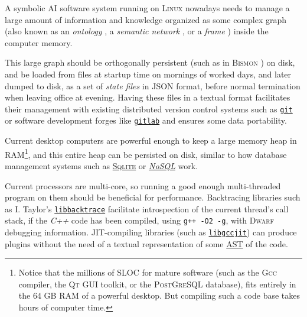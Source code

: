 \documentclass{IEEEtran}
\begin{document}
A symbolic AI software system running on \textsc{Linux} nowadays needs to
manage a large amount of information and knowledge organized as some
complex graph (also known as an \emph{ontology}
\cite{DeNicola:2009:OntologyBuilding}, a \emph{semantic network}
\cite{VanDeRiet:1992:Ling-instr-know}, or a \emph{frame}
\cite{Bobrow-Winograd:1977:KRL, Lenat:1983:theory}) inside the
computer memory. 

This large graph should be orthogonally persistent
\cite{Dearle:2010:orthopersist} (such as in \textsc{Bismon}
\cite{Starynkevitch:2019:bismon-draft}) on disk, and be loaded from
files at startup time on mornings of worked days, and later dumped to
disk, as a set of \emph{state files} in JSON format, before
normal termination when leaving office at evening. Having these files
in a textual format facilitates their management with existing
distributed version control systems such as
\href{http://git-scm.com}{\texttt{git}} or software development forges
like \href{http://gitlab.com/}{\texttt{gitlab}} and ensures some data
portability.

Current desktop computers are powerful enough to keep a large memory heap in
RAM\footnote{Notice that the millions of SLOC for mature software (such as the
\textsc{Gcc} compiler, the \textsc{Qt} GUI toolkit, or the
\textsc{PostGreSQL} database), fits entirely in the 64 GB RAM of a powerful desktop. 
But compiling such a code base takes hours of computer time.}, and this entire heap
can be persisted on disk, similar to how database management systems
such as \href{http://sqlite.org/}{\textsc{Sqlite}} or \href{https://en.wikipedia.org/wiki/NoSQL}{\textit{NoSQL}} work. 

Current processors are multi-core, so running a good enough multi-threaded program on them
\cite{butenhof:1997:programming} should be beneficial for
performance. Backtracing libraries such as I. Taylor's
\href{https://github.com/ianlancetaylor/libbacktrace}{\texttt{libbacktrace}}
facilitate introspection of the current thread's call stack, if the
\emph{C++} code has been compiled, using \texttt{g++ -O2 -g}, with
\textsc{Dwarf} debugging information. JIT-compiling libraries (such as
\href{https://gcc.gnu.org/onlinedocs/jit/}{\texttt{libgccjit}}) can
produce plugins without the need of a textual representation of some
\href{https://en.wikipedia.org/wiki/Abstract_syntax_tree}{AST} of the
code.
\end{document}
